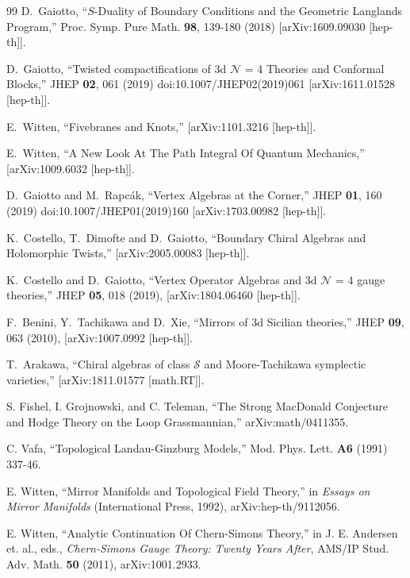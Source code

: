 \begin{thebibliography}{99}
D.~Gaiotto,
``$S$-Duality of Boundary Conditions and the Geometric Langlands Program,''
Proc. Symp. Pure Math. \textbf{98}, 139-180 (2018)
[arXiv:1609.09030 [hep-th]].


D.~Gaiotto,
``Twisted compactifications of 3d $ \mathcal{N} $ = 4 Theories and Conformal Blocks,''
JHEP \textbf{02}, 061 (2019)
doi:10.1007/JHEP02(2019)061
[arXiv:1611.01528 [hep-th]].


 




E.~Witten,
``Fivebranes and Knots,''
[arXiv:1101.3216 [hep-th]].

E.~Witten,
``A New Look At The Path Integral Of Quantum Mechanics,''
[arXiv:1009.6032 [hep-th]].

D.~Gaiotto and M.~Rapc\'ak,
``Vertex Algebras at the Corner,''
JHEP \textbf{01}, 160 (2019)
doi:10.1007/JHEP01(2019)160
[arXiv:1703.00982 [hep-th]].


K.~Costello, T.~Dimofte and D.~Gaiotto,
``Boundary Chiral Algebras and Holomorphic Twists,''
[arXiv:2005.00083 [hep-th]].


K.~Costello and D.~Gaiotto,
``Vertex Operator Algebras and 3d $ \mathcal{N} $ = 4 gauge theories,''
JHEP {\bf 05}, 018 (2019),
[arXiv:1804.06460 [hep-th]].


F.~Benini, Y.~Tachikawa and D.~Xie,
``Mirrors of 3d Sicilian theories,''
JHEP  {\bf 09}, 063 (2010),
[arXiv:1007.0992 [hep-th]].

T.~Arakawa,
``Chiral algebras of class $\mathcal{S}$ and Moore-Tachikawa symplectic varieties,''
[arXiv:1811.01577 [math.RT]].


S. Fishel, I. Grojnowski, and C. Teleman, ``The Strong MacDonald Conjecture and Hodge Theory on the Loop Grassmannian,'' arXiv:math/0411355.


 C. Vafa, ``Topological Landau-Ginzburg Models,'' Mod. Phys. Lett. {\bf A6} (1991) 337-46.

E. Witten, ``Mirror Manifolds and Topological Field Theory,''  in {\it Essays on Mirror Manifolds} (International Press, 1992), arXiv:hep-th/9112056.

E. Witten, ``Analytic Continuation Of Chern-Simons Theory,'' in J. E. Andersen et. al., eds., {\it Chern-Simons
Gauge Theory: Twenty Years After},  AMS/IP Stud. Adv. Math. {\bf 50} (2011), arXiv:1001.2933.


\end{thebibliography}
